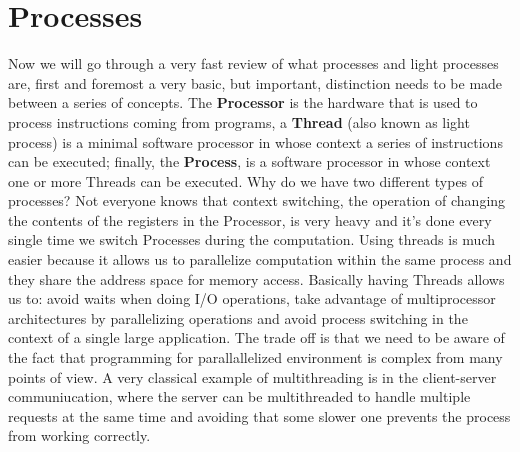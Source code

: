 \section{Processes}
Now we will go through a very fast review of what processes and light processes are, first and foremost a very basic, but important, distinction needs to be made between a series of concepts.
The \textbf{Processor} is the hardware that is used to process instructions coming from programs, a \textbf{Thread} (also known as light process) is a minimal software processor in whose context a series of instructions can be executed; finally, the \textbf{Process}, is a software processor in whose context one or more Threads can be executed. \n
Why do we have two different types of processes? Not everyone knows that context switching, the operation of changing the contents of the registers in the Processor, is very heavy and it's done every single time we switch Processes during the computation. Using threads is much easier because it allows us to parallelize computation within the same process and they share the address space for memory access. \n
Basically having Threads allows us to: avoid waits when doing I/O operations, take advantage of multiprocessor architectures by parallelizing operations and avoid process switching in the context of a single large application. \n
The trade off is that we need to be aware of the fact that programming for parallallelized environment is complex from many points of view. A very classical example of multithreading is in the client-server communiucation, where the server can be multithreaded to handle multiple requests at the same time and avoiding that some slower one prevents the process from working correctly. \n